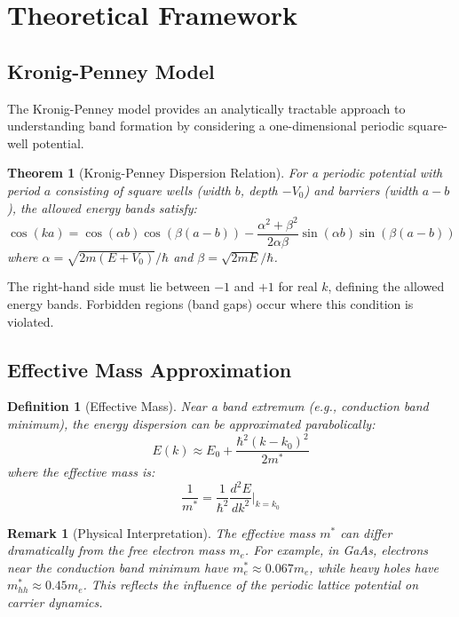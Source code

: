 \documentclass[11pt,a4paper]{article}
\newtheorem{definition}{Definition}[section]
\newtheorem{theorem}{Theorem}[section]
\newtheorem{remark}{Remark}[section]
\begin{document}
\section{Theoretical Framework}

\subsection{Kronig-Penney Model}

The Kronig-Penney model provides an analytically tractable approach to understanding band
formation by considering a one-dimensional periodic square-well potential.

\begin{theorem}[Kronig-Penney Dispersion Relation]
For a periodic potential with period $a$ consisting of square wells (width $b$, depth $-V_0$)
and barriers (width $a-b$), the allowed energy bands satisfy:
\begin{equation}
\cos(ka) = \cos(\alpha b)\cos(\beta(a-b)) - \frac{\alpha^2 + \beta^2}{2\alpha\beta}\sin(\alpha b)\sin(\beta(a-b))
\end{equation}
where $\alpha = \sqrt{2m(E+V_0)}/\hbar$ and $\beta = \sqrt{2mE}/\hbar$.
\end{theorem}

The right-hand side must lie between $-1$ and $+1$ for real $k$, defining the allowed energy
bands. Forbidden regions (band gaps) occur where this condition is violated.

\subsection{Effective Mass Approximation}

\begin{definition}[Effective Mass]
Near a band extremum (e.g., conduction band minimum), the energy dispersion can be approximated
parabolically:
\begin{equation}
E(k) \approx E_0 + \frac{\hbar^2(k - k_0)^2}{2m^*}
\end{equation}
where the effective mass is:
\begin{equation}
\frac{1}{m^*} = \frac{1}{\hbar^2}\frac{d^2E}{dk^2}\bigg|_{k=k_0}
\end{equation}
\end{definition}

\begin{remark}[Physical Interpretation]
The effective mass $m^*$ can differ dramatically from the free electron mass $m_e$. For
example, in GaAs, electrons near the conduction band minimum have $m_e^* \approx 0.067 m_e$,
while heavy holes have $m_{hh}^* \approx 0.45 m_e$. This reflects the influence of the
periodic lattice potential on carrier dynamics.
\end{remark}
\end{document}
